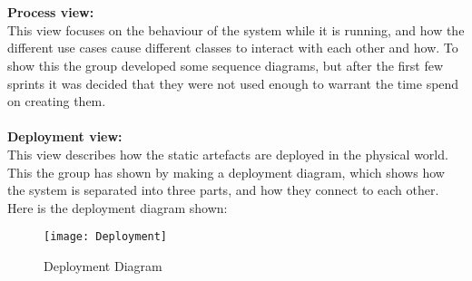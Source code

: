\\
\\
\textbf{Process view:}
\\
This view focuses on the behaviour of the system while it is running, and
how the different use cases cause different classes to interact with each
other and how. To show this the group developed some sequence diagrams, but
 after the first few sprints it was decided that they were not used enough
 to warrant the time spend on creating them.
\\
\\
\textbf{Deployment view:}
\\
This view describes how the static artefacts are deployed in the physical
world. This the group has shown by making a deployment diagram, which shows
how the system is separated into three parts, and how they connect to each
other. Here is the deployment diagram shown:
\begin{figure}
\centerline{\texttt{[image: Deployment]} }
\caption{Deployment Diagram}
\end{figure}
